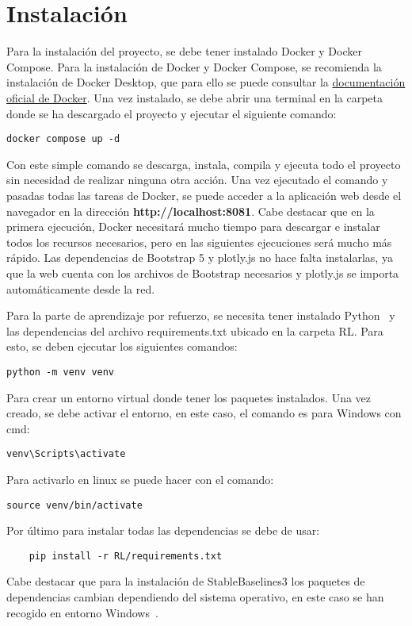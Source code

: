 \section{Instalación}
\label{sec:instalacion}
Para la instalación del proyecto, se debe tener instalado Docker y Docker Compose. Para la instalación de Docker y Docker Compose, se recomienda la instalación de Docker Desktop, que para ello se puede consultar la \href{https://docs.docker.com/get-docker/}{documentación oficial de Docker}. Una vez instalado, se debe abrir una terminal en la carpeta donde se ha descargado el proyecto y ejecutar el siguiente comando:
\begin{verbatim}
docker compose up -d
\end{verbatim}
Con este simple comando se descarga, instala, compila y ejecuta todo el proyecto sin necesidad de realizar ninguna otra acción.
Una vez ejecutado el comando y pasadas todas las tareas de Docker, se puede acceder a la aplicación web desde el navegador en la dirección \textbf{http://localhost:8081}. Cabe destacar que en la primera ejecución, Docker necesitará mucho tiempo para descargar e instalar todos los recursos necesarios, pero en las siguientes ejecuciones será mucho más rápido.
Las dependencias de Bootstrap 5 y plotly.js no hace falta instalarlas, ya que la web cuenta con los archivos de Bootstrap necesarios y plotly.js se importa automáticamente desde la red.



Para la parte de aprendizaje por refuerzo, se necesita tener instalado Python~\cite{python} y las dependencias del archivo requirements.txt ubicado en la carpeta RL. Para esto, se deben ejecutar los siguientes comandos:
\begin{verbatim}
python -m venv venv
\end{verbatim}
Para crear un entorno virtual donde tener los paquetes instalados. Una vez creado, se debe activar el entorno, en este caso, el comando es para Windows con cmd:
\begin{verbatim}
venv\Scripts\activate
\end{verbatim}
Para activarlo en linux se puede hacer con el comando:
\begin{verbatim}
source venv/bin/activate
\end{verbatim}
Por último para instalar todas las dependencias se debe de usar:
\begin{verbatim}
    pip install -r RL/requirements.txt
\end{verbatim}
Cabe destacar que para la instalación de StableBaselines3 los paquetes de dependencias cambian dependiendo del sistema operativo, en este caso se han recogido en entorno Windows~\cite{stable}.


